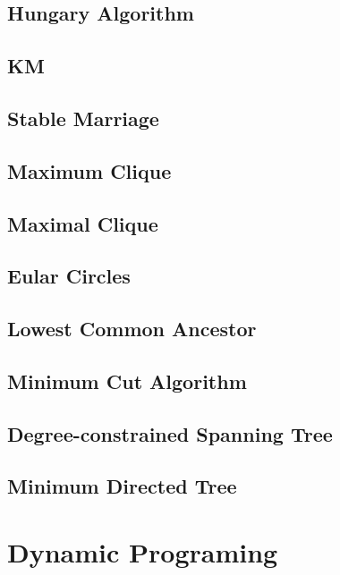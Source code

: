 \documentclass[a4paper,5pt,twocolumn,titlepage]{article}
\begin{document}
\begin{CJK*}{GBK}{song}
\subsection{Hungary Algorithm}

\subsection{KM}

\subsection{Stable Marriage}

\subsection{Maximum Clique}

\subsection{Maximal Clique}

\subsection{Eular Circles}

\subsection{Lowest Common Ancestor}

\subsection{Minimum Cut Algorithm}

\subsection{Degree-constrained Spanning Tree}

\subsection{Minimum Directed Tree}

\section{Dynamic Programing}

\end{CJK*}
\end{document}

